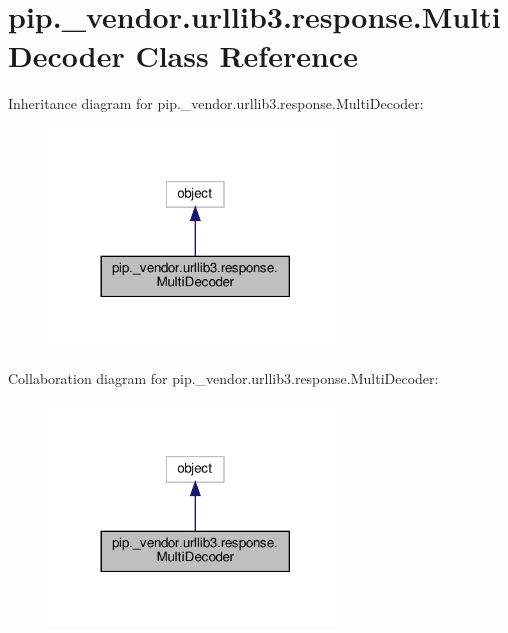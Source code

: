 \hypertarget{classpip_1_1__vendor_1_1urllib3_1_1response_1_1MultiDecoder}{}\section{pip.\+\_\+vendor.\+urllib3.\+response.\+Multi\+Decoder Class Reference}
\label{classpip_1_1__vendor_1_1urllib3_1_1response_1_1MultiDecoder}


Inheritance diagram for pip.\+\_\+vendor.\+urllib3.\+response.\+Multi\+Decoder\+:
\nopagebreak
\begin{figure}[H]
\begin{center}
\leavevmode
\includegraphics[width=221pt]{classpip_1_1__vendor_1_1urllib3_1_1response_1_1MultiDecoder__inherit__graph}
\end{center}
\end{figure}


Collaboration diagram for pip.\+\_\+vendor.\+urllib3.\+response.\+Multi\+Decoder\+:
\nopagebreak
\begin{figure}[H]
\begin{center}
\leavevmode
\includegraphics[width=221pt]{classpip_1_1__vendor_1_1urllib3_1_1response_1_1MultiDecoder__coll__graph}
\end{center}
\end{figure}
